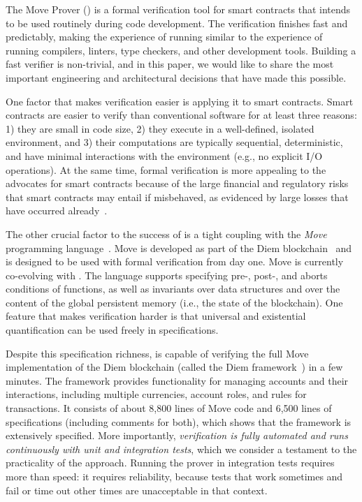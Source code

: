 
The Move Prover (\MVP) is a formal verification tool for smart contracts that
intends to be used routinely during code development.  The verification finishes
fast and predictably, making the experience of running \MVP similar to the
experience of running compilers, linters, type checkers, and other development
tools.  Building a fast verifier is non-trivial, and in this paper, we would
like to share the most important engineering and architectural decisions that
have made this possible.

One factor that makes verification easier is applying it to smart contracts.
Smart contracts are easier to verify than conventional software for at least
three reasons: 1) they are small in code size, 2) they execute in a
well-defined, isolated environment, and 3) their computations are typically
sequential, deterministic, and have minimal interactions with the environment
(e.g., no explicit I/O operations).  At the same time, formal verification is
more appealing to the advocates for smart contracts because of the large
financial and regulatory risks that smart contracts may entail if misbehaved, as
evidenced by large losses that have occurred
already~\cite{CONTRACT_VERIFICATION,hacks-on-smart-contracts,hacks-on-compound}.

The other crucial factor to the success of \MVP is a tight coupling with the
\emph{Move} programming language~\cite{MOVE_LANG}.  Move is developed as part of
the Diem blockchain~\cite{DIEM} and is designed to be used with formal
verification from day one.  Move is currently co-evolving with \MVP.  The
language supports specifying pre-, post-, and aborts conditions of functions, as
well as invariants over data structures and over the content of the global
persistent memory (i.e., the state of the blockchain).  One feature that makes
verification harder is that universal and existential quantification can be used
freely in specifications.

Despite this specification richness, \MVP is capable of verifying the full Move
implementation of the Diem blockchain (called the Diem
framework~\cite{DIEM_FRAMEWORK}) in a few minutes.  The framework provides
functionality for managing accounts and their interactions, including multiple
currencies, account roles, and rules for transactions.  It consists of about
8,800 lines of Move code and 6,500 lines of specifications (including comments
for both), which shows that the framework is extensively specified.  More
importantly, \emph{verification is fully automated and runs continuously with
  unit and integration tests}, which we consider a testament to the practicality
of the approach.  Running the prover in integration tests requires more than
speed: it requires reliability, because tests that work sometimes and fail or
time out other times are unacceptable in that context.

